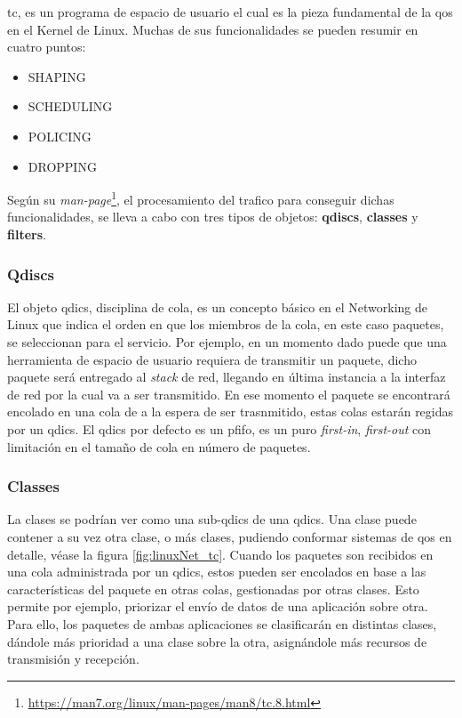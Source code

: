 \gls{tc}, es un programa de espacio de usuario el cual es la pieza fundamental de la \gls{qos} en el Kernel de Linux. Muchas de sus funcionalidades se pueden resumir en cuatro puntos:

\begin{itemize}
    \item \textsc{SHAPING}
    \item \textsc{SCHEDULING}
    \item \textsc{POLICING}
    \item \textsc{DROPPING}
\end{itemize}

 Según su \textit{man-page}\footnote{\url{https://man7.org/linux/man-pages/man8/tc.8.html}}, el procesamiento del trafico para conseguir dichas funcionalidades, se lleva a cabo con tres tipos de objetos: \textbf{qdiscs}, \textbf{classes} y \textbf{filters}.

\subsubsection{Qdiscs}

El objeto \gls{qdics}, disciplina de cola, es un concepto básico en el Networking de Linux que indica el orden en que los miembros de la cola, en este caso paquetes, se seleccionan para el servicio. Por ejemplo, en un momento dado puede que una herramienta de espacio de usuario requiera de transmitir un paquete, dicho paquete será entregado al \textit{stack} de red, llegando en última instancia a la interfaz de red por la cual va a ser transmitido. En ese momento el paquete se encontrará encolado en una cola de a la espera de ser trasnmitido, estas colas estarán regidas por un \gls{qdics}. El \gls{qdics} por defecto es un pfifo, es un puro \textit{first-in}, \textit{first-out} con limitación en el tamaño de cola en número de paquetes.


\subsubsection{Classes}

La clases se podrían ver como una sub-\gls{qdics} de una \gls{qdics}. Una clase puede contener a su vez otra clase, o más clases, pudiendo conformar sistemas de \gls{qos} en detalle, véase la figura \ref{fig:linuxNet_tc}. Cuando los paquetes son recibidos en una cola administrada por un \gls{qdics}, estos pueden ser encolados en base a las características del paquete en otras colas,  gestionadas por otras clases. Esto permite por ejemplo, priorizar el envío de datos de una aplicación sobre otra. Para ello, los paquetes de ambas aplicaciones se clasificarán en distintas clases, dándole más prioridad a una clase sobre la otra, asignándole más recursos de transmisión y recepción.

